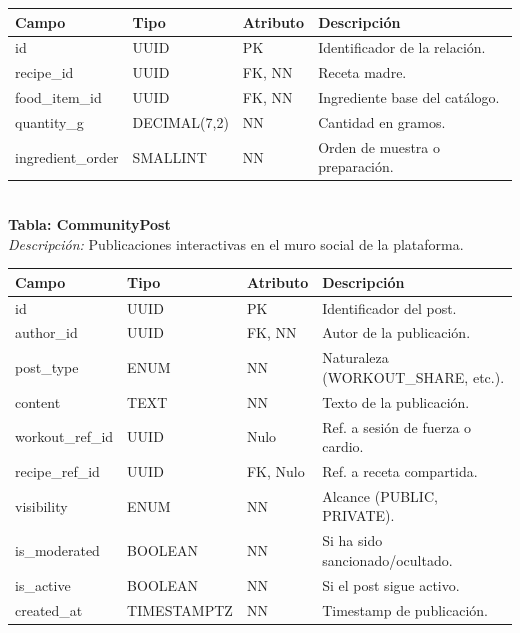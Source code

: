 \documentclass[12pt]{article}
\begin{document}
\begin{table}[h!]
    \centering
    \renewcommand{\arraystretch}{1.2}
    \small
    \begin{tabular}{|p{3.5cm}|p{2.7cm}|p{2cm}|p{6.5cm}|}
        \hline
        \rowcolor[HTML]{EFEFEF}
        \textbf{Campo} & \textbf{Tipo} & \textbf{Atributo} & \textbf{Descripción} \\ \hline
        id & UUID & PK & Identificador de la relación. \\ \hline
        recipe\_id & UUID & FK, NN & Receta madre. \\ \hline
        food\_item\_id & UUID & FK, NN & Ingrediente base del catálogo. \\ \hline
        quantity\_g & DECIMAL(7,2) & NN & Cantidad en gramos. \\ \hline
        ingredient\_order & SMALLINT & NN & Orden de muestra o preparación. \\ \hline
    \end{tabular}
\end{table}
\\
\noindent\textbf{Tabla: CommunityPost} \\
\textit{Descripción:} Publicaciones interactivas en el muro social de la plataforma.
\begin{table}[h!]
    \centering
    \renewcommand{\arraystretch}{1.2}
    \small
    \begin{tabular}{|p{3.5cm}|p{2.7cm}|p{2cm}|p{6.5cm}|}
        \hline
        \rowcolor[HTML]{EFEFEF}
        \textbf{Campo} & \textbf{Tipo} & \textbf{Atributo} & \textbf{Descripción} \\ \hline
        id & UUID & PK & Identificador del post. \\ \hline
        author\_id & UUID & FK, NN & Autor de la publicación. \\ \hline
        post\_type & ENUM & NN & Naturaleza (WORKOUT\_SHARE, etc.). \\ \hline
        content & TEXT & NN & Texto de la publicación. \\ \hline
        workout\_ref\_id & UUID & Nulo & Ref. a sesión de fuerza o cardio. \\ \hline
        recipe\_ref\_id & UUID & FK, Nulo & Ref. a receta compartida. \\ \hline
        visibility & ENUM & NN & Alcance (PUBLIC, PRIVATE). \\ \hline
        is\_moderated & BOOLEAN & NN & Si ha sido sancionado/ocultado. \\ \hline
        is\_active & BOOLEAN & NN & Si el post sigue activo. \\ \hline
        created\_at & TIMESTAMPTZ & NN & Timestamp de publicación. \\ \hline
    \end{tabular}
\end{table}
\end{document}
